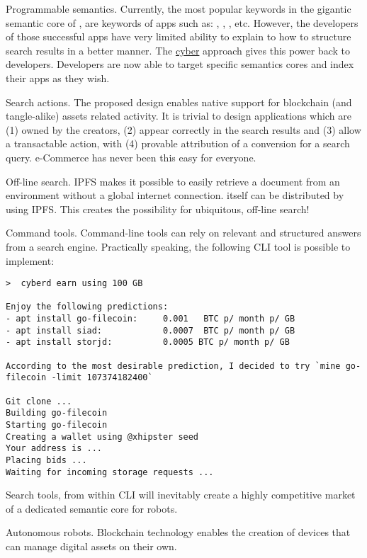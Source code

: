 \documentclass[8pt,oneside]{amsart}
\newcommand{\linkred}[2]{\href{#1}{\color{red}{#2}}}
\begin{document}
Programmable semantics. Currently, the most popular keywords in the gigantic semantic core of \linkred{https://google.com}{Google}, are keywords of apps such as: \linkred{https://youtube.com}{Youtube}, \linkred{https://facebook.com}{Facebook}, \linkred{https://github.com}{GitHub}, etc. However, the developers of those successful apps have very limited ability to explain to \linkred{https://google.com}{Google} how to structure search results in a better manner. The {\hyperref[cyber]{cyber}} approach gives this power back to developers. Developers are now able to target specific semantics cores and index their apps as they wish.

Search actions. The proposed design enables native support for blockchain (and tangle-alike) assets related activity. It is trivial to design applications which are (1) owned by the creators, (2) appear correctly in the search results and (3) allow a transactable action, with (4) provable attribution of a conversion for a search query. e-Commerce has never been this easy for everyone.

Off-line search. IPFS makes it possible to easily retrieve a document from an environment without a global internet connection. \linkred{https://github.com/cybercongress/cyberd}{cyberd} itself can be distributed by using IPFS. This creates the possibility for ubiquitous, off-line search!

Command tools. Command-line tools can rely on relevant and structured answers from a search engine. Practically speaking, the following CLI tool is possible to implement:

\begin{lstlisting}
>  cyberd earn using 100 GB

Enjoy the following predictions:
- apt install go-filecoin:     0.001   BTC p/ month p/ GB
- apt install siad:            0.0007  BTC p/ month p/ GB
- apt install storjd:          0.0005 BTC p/ month p/ GB

According to the most desirable prediction, I decided to try `mine go-filecoin -limit 107374182400`

Git clone ...
Building go-filecoin
Starting go-filecoin
Creating a wallet using @xhipster seed
Your address is ...
Placing bids ...
Waiting for incoming storage requests ...
\end{lstlisting}

Search tools, from within CLI will inevitably create a highly competitive market of a dedicated semantic core for robots.

Autonomous robots. Blockchain technology enables the creation of devices that can manage digital assets on their own.
\end{document}
